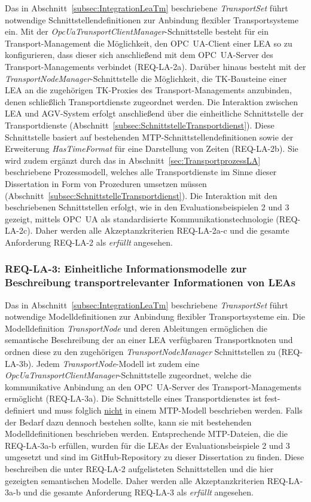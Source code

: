 Das in Abschnitt~\ref{subsec:IntegrationLeaTm} beschriebene \emph{TransportSet} führt notwendige Schnittstellendefinitionen zur Anbindung flexibler Transportsysteme ein. Mit der \emph{OpcUaTransportClientManager}-Schnittstelle besteht für ein Transport-Management die Möglichkeit, den OPC~UA-Client einer LEA so zu konfigurieren, dass dieser sich anschließend mit dem OPC~UA-Server des Transport-Managements verbindet (REQ-LA-2a). Darüber hinaus besteht mit der \emph{TransportNodeManager}-Schnittstelle die Möglichkeit, die TK-Bausteine einer LEA an die zugehörigen TK-Proxies des Transport-Managements anzubinden, denen schließlich Transportdienste zugeordnet werden. Die Interaktion zwischen LEA und AGV-System erfolgt anschließend über die einheitliche Schnittstelle der Transportdienste (Abschnitt~\ref{subsec:SchnittstelleTransportdienst}). Diese Schnittstelle basiert auf bestehenden MTP-Schnittstellendefinitionen sowie der Erweiterung \emph{HasTimeFormat} für eine Darstellung von Zeiten (REQ-LA-2b). Sie wird zudem ergänzt durch das in Abschnitt~\ref{sec:TransportprozessLA} beschriebene Prozessmodell, welches alle Transportdienste im Sinne dieser Dissertation in Form von Prozeduren umsetzen müssen (Abschnitt~\ref{subsec:SchnittstelleTransportdienst}). Die Interaktion mit den beschriebenen Schnittstellen erfolgt, wie in den Evaluationsbeispielen 2 und 3 gezeigt, mittels OPC~UA als standardisierte Kommunikationstechnologie (REQ-LA-2c). Daher werden alle Akzeptanzkriterien REQ-LA-2a-c und die gesamte Anforderung REQ-LA-2 als \emph{erfüllt} angesehen.

\subsubsection{REQ-LA-3: Einheitliche Informationsmodelle zur Beschreibung transportrelevanter Informationen von LEAs}

Das in Abschnitt~\ref{subsec:IntegrationLeaTm} beschriebene \emph{TransportSet} führt notwendige Modelldefinitionen zur Anbindung flexibler Transportsysteme ein. Die Modelldefinition \emph{TransportNode} und deren Ableitungen ermöglichen die semantische Beschreibung der an einer LEA verfügbaren Transportknoten und ordnen diese zu den zugehörigen \emph{TransportNodeManager} Schnittstellen zu (REQ-LA-3b). Jedem \emph{TransportNode}-Modell ist zudem eine \emph{OpcUaTransportClientManager}-Schnittstelle zugeordnet, welche die kommunikative Anbindung an den OPC~UA-Server des Transport-Managements ermöglicht (REQ-LA-3a). Die Schnittstelle eines Transportdienstes ist fest-definiert und muss folglich \underline{nicht} in einem MTP-Modell beschrieben werden. Falls der Bedarf dazu dennoch bestehen sollte, kann sie mit bestehenden Modelldefinitionen beschrieben werden. Entsprechende MTP-Dateien, die die REQ-LA-3a-b erfüllen, wurden für die LEAs der Evaluationsbeispiele 2 und 3 umgesetzt und sind im GitHub-Repository zu dieser Dissertation \cite{Blumenstein.Github} zu finden. Diese beschreiben die unter REQ-LA-2 aufgelisteten Schnittstellen und die hier gezeigten semantischen Modelle. Daher werden alle Akzeptanzkriterien REQ-LA-3a-b und die gesamte Anforderung REQ-LA-3 als \emph{erfüllt} angesehen.

